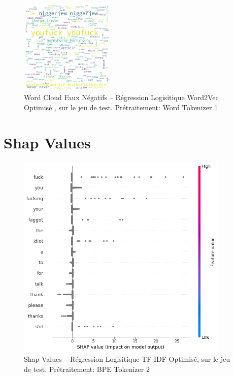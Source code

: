 \begin{figure}[h]
    \centering
    \includegraphics[width=0.4\textwidth]{figures/word-cloud-reg-w2v-fn.png}
    \caption{Word Cloud Faux Négatifs – Régression Logisitique Word2Vec Optimisé , sur le jeu de test. Prétraitement:  Word Tokenizer 1}
\end{figure}

\newpage

\section{Shap Values}
\begin{figure}[h]
    \centering
    \includegraphics[width=0.9\textwidth]{figures/reg-tf-shap.png}
    \caption{Shap Values – Régression Logisitique TF-IDF Optimisé, sur le jeu de test. Prétraitement: BPE Tokenizer 2}
\end{figure}
